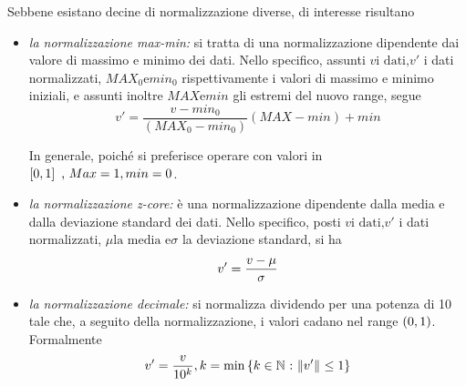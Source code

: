 \documentclass{subfiles}
\begin{document}
Sebbene esistano decine di normalizzazione diverse, di interesse risultano
\begin{itemize}
    \item \emph{la normalizzazione max-min:} si tratta di una normalizzazione dipendente dai valore di massimo e minimo dei dati.
          Nello specifico, assunti $v \text{i dati,} v' $ i dati normalizzati, $MAX_{0} \text{e} min_{0}$ rispettivamente i valori di massimo e minimo iniziali,
          e assunti inoltre $MAX \text{e} min$ gli estremi del nuovo range, segue
          $$
              v' = \frac{v - min_{0}}{(MAX_{0} - min_{0})}(MAX - min) + min
          $$
          \begin{MarginNote}
              In generale, poiché si preferisce operare con valori in $\Range*{0}{1} \text{,} Max = 1, min = 0$.
          \end{MarginNote}

    \item \emph{la normalizzazione z-core:} è una normalizzazione dipendente dalla media e dalla deviazione standard dei dati.
          Nello specifico, posti $v \text{i dati,} v'$ i dati normalizzati, $\mu \text{la media e} \sigma$ la deviazione standard, si ha
          $$
              v' = \Frac{v - \mu}{\sigma}
          $$

    \item \emph{la normalizzazione decimale:} si normalizza dividendo per una potenza di 10 tale che,
          a seguito della normalizzazione, i valori cadano nel range $\Range{0}{1}$.
          Formalmente
          $$
              v' = \Frac{v}{10^{k}}, k = \Min{k \in \Natural}[\Norm{v'} \le 1]
          $$
\end{itemize}
\end{document}
